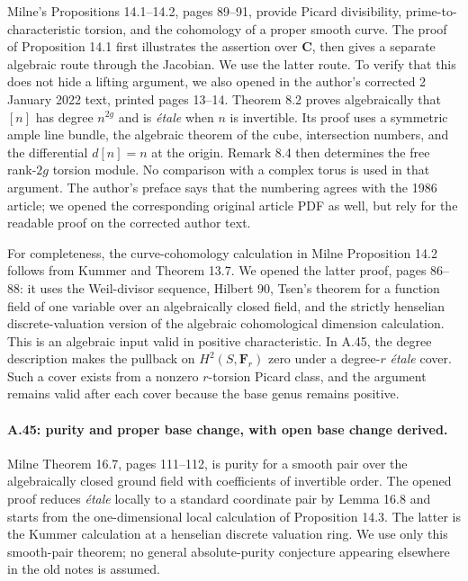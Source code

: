Milne's Propositions 14.1--14.2, pages 89--91, provide Picard
divisibility, prime-to-characteristic torsion, and the cohomology
of a proper smooth curve. The proof of Proposition 14.1 first
illustrates the assertion over $\mathbf C$, then gives a separate
algebraic route through the Jacobian. We use the latter route.
To verify that this does not hide a lifting argument, we also
opened \citet[Theorem 8.2 and Remark 8.4]{CF_MilneAV1986} in the
author's corrected 2 January 2022 text, printed pages 13--14.
Theorem 8.2 proves algebraically that $[n]$ has degree $n^{2g}$
and is \emph{\'etale} when $n$ is invertible. Its proof uses a
symmetric ample line bundle, the algebraic theorem of the cube,
intersection numbers, and the differential $d[n]=n$ at the
origin. Remark 8.4 then determines the free rank-$2g$ torsion
module. No comparison with a complex torus is used in that
argument. The author's preface says that the numbering agrees
with the 1986 article; we opened the corresponding original
article PDF as well, but rely for the readable proof on the
corrected author text.

For completeness, the curve-cohomology calculation in Milne
Proposition 14.2 follows from Kummer and Theorem 13.7. We opened
the latter proof, pages 86--88: it uses the Weil-divisor sequence,
Hilbert 90, Tsen's theorem for a function field of one variable
over an algebraically closed field, and the strictly henselian
discrete-valuation version of the algebraic cohomological
dimension calculation. This is an algebraic input valid in
positive characteristic. In A.45, the degree description makes
the pullback on $H^2(S,\mathbf F_r)$ zero under a degree-$r$
\emph{\'etale} cover. Such a cover exists from a nonzero
$r$-torsion Picard class, and the argument remains valid after
each cover because the base genus remains positive.

\paragraph{A.45: purity and proper base change, with open base change derived.}
Milne Theorem 16.7, pages 111--112, is purity for a smooth pair
over the algebraically closed ground field with coefficients of
invertible order. The opened proof reduces \emph{\'etale} locally
to a standard coordinate pair by Lemma 16.8 and starts from the
one-dimensional local calculation of Proposition 14.3. The latter
is the Kummer calculation at a henselian discrete valuation ring.
We use only this smooth-pair theorem; no general absolute-purity
conjecture appearing elsewhere in the old notes is assumed.

